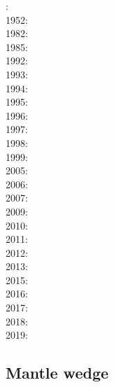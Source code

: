 {\scriptsize
{}: \cite{wiad23}\\
1952: \cite{birc52}\\
1982: \cite{yusb82}\cite{chri82}\\
1985: \cite{chyu85}\\
1992: \cite{zhyh92}\\
1993: \cite{tasg93}\cite{best93}\cite{kief93}\cite{styz93}\\
1994: \cite{vayv94}\cite{zhgu94b}\cite{styu94}\\
1995: \cite{zhyu95}\cite{chri95}\cite{scta95}\cite{tack95}\\
1996: \cite{pelt96}\cite{mitr96}\cite{tack96b}\\
1997: \cite{mifo97}\cite{pebs97}\\
1998: \cite{cava98}\cite{kenn98}\\
1999: \cite{sigh99}\cite{kehv99}\cite{vaka99}\\
2005: \cite{hett05}\cite{nata05b}\cite{nabu05}\cite{stli05}\cite{stli05b}\\
2006: \cite{javd06}\cite{stca06}\\
2007: \cite{pazw07}\cite{mofm07}\cite{tanh07}\cite{stli07}\cite{lioh07}\cite{jade07}\cite{pisb07}\\
2009: \cite{natd09}\\
2010: \cite{kayy10}\\
2011: \cite{java11}\cite{faff11}\cite{nata11}\cite{vayj11}\cite{stli11}\\
2012: \cite{tack12}\cite{sato12}\cite{natd12}\cite{stli12}\\
2013: \cite{fakc13}\cite{taab13}\cite{jasv13}\\
2015: \cite{basn15}\cite{glfa15}\cite{amsb15}\\
2016: \cite{tiro16}\cite{beci16}\\
2017: \cite{vavs17}\cite{jasv17}\cite{bahh17}\\
2018: \cite{mazh18}\cite{naoi18}\\
2019: \cite{jasv19}
}

\subsection{Mantle wedge} 

